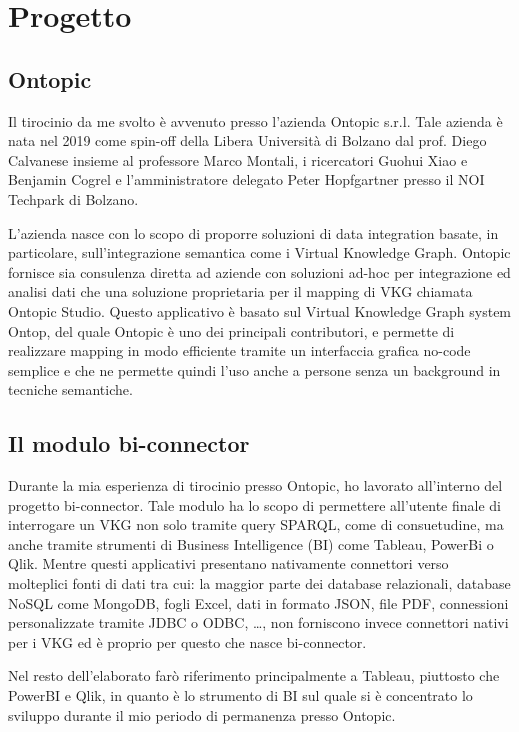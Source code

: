 \chapter{Progetto}
\label{cha:experience}

\section{Ontopic}
\label{sec:ontopic}
Il tirocinio da me svolto è avvenuto presso l'azienda Ontopic s.r.l. Tale azienda è nata nel 2019 come spin-off della Libera Università di Bolzano dal prof. Diego Calvanese insieme al professore Marco Montali, i ricercatori Guohui Xiao e Benjamin Cogrel
e l’amministratore delegato Peter Hopfgartner presso il NOI Techpark di Bolzano\cite{Ontopic}.

L'azienda nasce con lo scopo di proporre soluzioni di data integration basate, in particolare, sull'integrazione semantica come i Virtual Knowledge Graph. Ontopic fornisce sia consulenza diretta ad aziende con soluzioni ad-hoc
per integrazione ed analisi dati che una soluzione proprietaria per il mapping di VKG chiamata Ontopic Studio. Questo applicativo è basato sul Virtual Knowledge Graph system Ontop, del quale Ontopic è uno dei principali contributori, 
e permette di realizzare mapping in modo efficiente tramite un interfaccia grafica no-code semplice e che ne permette quindi l'uso anche a persone senza un background in tecniche semantiche. \cite{OntopicStudio}

\section{Il modulo bi-connector}
\label{sec:bi-connector}
Durante la mia esperienza di tirocinio presso Ontopic, ho lavorato all'interno del progetto bi-connector. Tale modulo ha lo scopo di permettere all'utente finale di interrogare un VKG non solo tramite query SPARQL, come di consuetudine, ma anche
tramite strumenti di Business Intelligence (BI) come Tableau, PowerBi o Qlik.
Mentre questi applicativi presentano nativamente connettori verso molteplici fonti di dati tra cui: la maggior parte dei database relazionali, database NoSQL come MongoDB, fogli Excel,
dati in formato JSON, file PDF, connessioni personalizzate tramite JDBC o ODBC, \dots, non forniscono invece connettori nativi per i VKG ed è proprio per questo che nasce bi-connector.

Nel resto dell'elaborato farò riferimento principalmente a Tableau, piuttosto che PowerBI e Qlik, in quanto è lo strumento di BI sul quale si è concentrato lo sviluppo durante il mio periodo di permanenza presso Ontopic.

